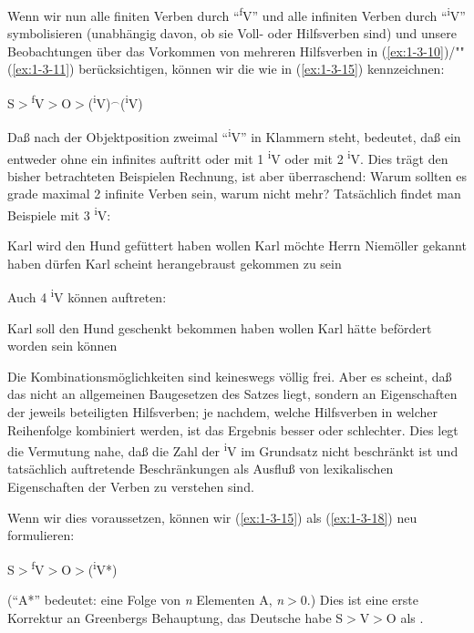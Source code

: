 \documentclass[output=paper]{langsci/langscibook}
\begin{document}
Wenn wir nun alle finiten Verben durch "`\textsuperscript{f}V"' und alle infiniten Verben durch
"`\textsuperscript{i}V"' symbolisieren (unabhängig davon, ob sie Voll- oder Hilfsverben sind) und
unsere Beobachtungen über das Vorkommen von mehreren Hilfsverben in (\ref{ex:1-3-10})/""(\ref{ex:1-3-11}) berücksichtigen, können wir die  wie in (\ref{ex:1-3-15}) kennzeichnen:
\begin{exe}
\ex\label{ex:1-3-15}
S$>$\textsuperscript{f}V$>$O$>$(\textsuperscript{i}V)$^{\smallfrown}$(\textsuperscript{i}V)
\end{exe}
Daß nach der Objektposition zweimal "`\textsuperscript{i}V"' in Klammern
steht, bedeutet, daß ein  entweder ohne ein infinites
 auftritt oder mit 1 \textsuperscript{i}V oder mit 2
\textsuperscript{i}V. Dies trägt den bisher betrachteten Beispielen
Rechnung, ist aber überraschend: Warum sollten es grade maximal 2
infinite Verben sein, warum nicht mehr? Tatsächlich findet man
Beispiele mit 3 \textsuperscript{i}V:
\begin{exe}
\ex\label{ex:1-3-16}
\begin{xlist}
\ex\label{ex:1-3-16a}  Karl wird den Hund gefüttert haben wollen
\ex\label{ex:1-3-16b} Karl möchte Herrn Niemöller gekannt haben dürfen
\ex\label{ex:1-3-16c} Karl scheint herangebraust gekommen zu sein
\end{xlist}
\end{exe}
Auch 4 \textsuperscript{i}V können auftreten:
\begin{exe}
\ex\label{ex:1-3-17}
\begin{xlist}
\ex\label{ex:1-3-17a}  Karl soll den Hund geschenkt bekommen haben wollen
\ex\label{ex:1-3-17b} Karl hätte befördert worden sein können
\end{xlist}
\end{exe}
Die Kombinationsmöglichkeiten sind keineswegs völlig frei. Aber es scheint, daß das
nicht an allgemeinen Baugesetzen des Satzes liegt, sondern an Eigenschaften der jeweils beteiligten Hilfsverben; je nachdem, welche Hilfsverben in welcher Reihenfolge kombiniert werden, ist das Ergebnis besser oder schlechter. Dies legt die Vermutung nahe, daß die Zahl der \textsuperscript{i}V im Grundsatz nicht beschränkt ist und tatsächlich
auftretende Beschränkungen als Ausfluß von lexikalischen Eigenschaften der Verben
zu verstehen sind.

Wenn wir dies voraussetzen, können wir (\ref{ex:1-3-15}) als (\ref{ex:1-3-18}) neu formulieren:
\begin{exe}
\ex\label{ex:1-3-18}
S$>$\textsuperscript{f}V$>$O$>$(\textsuperscript{i}V*)
\end{exe}
("`A*"' bedeutet: eine Folge von \emph{n} Elementen A, \emph{n}$>$0.) Dies ist eine erste Korrektur an
Greenbergs Behauptung, das Deutsche habe S$>$V$>$O als .
\end{document}
